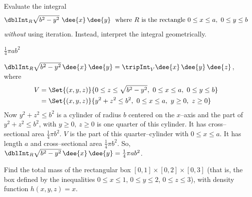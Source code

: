 


\subsection*{\Conceptual}

\begin{question}
Evaluate the integral 
\begin{equation*}
\text{$\dblInt_R \sqrt{b^2-y^2}\ \dee{x}\,\dee{y}$\ \  
where $R$ is the rectangle  $0\le x\le a,\ 0\le y\le b$}
\end{equation*}
\emph{without} using iteration. Instead, interpret the integral 
geometrically.
\end{question}

%

\begin{answer}
$\frac{1}{4}\pi ab^2$
\end{answer}

\begin{solution}
$\dblInt_R \sqrt{b^2-y^2}\,\dee{x}\,\dee{y}
=\tripInt_V \dee{x}\,\dee{y}\,\dee{z}$, where 
\begin{align*}
V&=\Set{(x,y,z)} {0\le z\le\sqrt{b^2-y^2},\  0\le x\le a,\  0\le y\le b} \\
 &=\Set{(x,y,z)} {y^2+z^2\le b^2,\  0\le x\le a,\  y\ge 0,\ z\ge 0}
\end{align*}
Now $y^2+z^2\le b^2$ is a cylinder of radius $b$ centered on the $x$--axis and the part of $y^2+z^2\le b^2$, with $y\ge0,\ z\ge0$ is one quarter of this cylinder.
It has cross--sectional area $\frac{1}{4}\pi b^2$. $V$ is the part of
this quarter--cylinder with $0\le x\le a$. It has length $a$ and 
cross--sectional area $\frac{1}{4}\pi b^2$. So, 
$\dblInt_R \sqrt{b^2-y^2}\,\dee{x}\,\dee{y}=\frac{1}{4}\pi ab^2$.
\end{solution}


\begin{question}[M200 2013D] %
Find the total mass of the rectangular box 
$[0, 1] \times [0, 2] \times [0, 3]$ (that is, the box
defined by the inequalities $0 \le x \le 1$, $0 \le y \le 2$, 
$0 \le z \le 3$), with density function $h(x, y, z) = x$.
\end{question}

%

